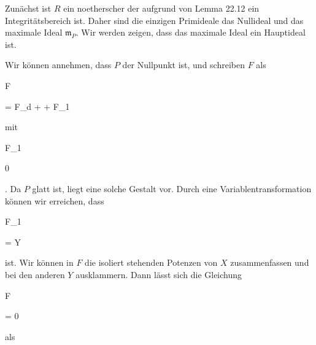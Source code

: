 {


Zunächst ist $R$ ein noetherscher
der aufgrund von
Lemma 22.12
ein Integritätsbereich ist. Daher sind die einzigen Primideale das Nullideal und das maximale Ideal ${\mathfrak m}_P$. Wir werden zeigen, dass das maximale Ideal ein Hauptideal ist.


Wir können annehmen, dass $P$ der Nullpunkt ist, und schreiben $F$ als


\mavergleichskettedisp

{\vergleichskette

{ F
}

{ =} { F_d + \cdots +  F_1
}

{ } {
}

{ } {
}

{ } {
}

}
{}{}{}
mit


\mavergleichskette

{\vergleichskette

{F_1
}

{ \neq }{ 0
}

{  }{
}

{    }{
}

{   }{
}

}
{}{}{.}
Da $P$ glatt ist, liegt eine solche Gestalt vor. Durch eine Variablentransformation können wir erreichen, dass


\mavergleichskette

{\vergleichskette

{ F_1
}

{ = }{ Y
}

{  }{
}

{    }{
}

{   }{
}

}
{}{}{}
ist. Wir können in $F$ die isoliert stehenden Potenzen von $X$
 {} {}
zusammenfassen und bei den anderen $Y$ ausklammern. Dann lässt sich die Gleichung


\mavergleichskette

{\vergleichskette

{ F
}

{ = }{ 0
}

{  }{
}

{    }{
}

{   }{
}

}
{}{}{}
als


\mavergleichskettedisp

{\vergleichskette

}}
